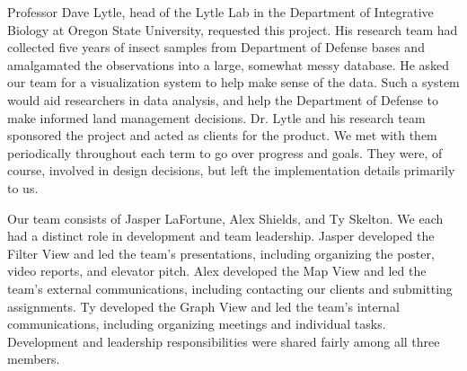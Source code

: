 Professor Dave Lytle, head of the Lytle Lab in the Department of Integrative Biology at Oregon State University, requested this project.
His research team had collected five years of insect samples from Department of Defense bases and amalgamated the observations into a large, somewhat messy database.
He asked our team for a visualization system to help make sense of the data.
Such a system would aid researchers in data analysis, and help the Department of Defense to make informed land management decisions.
Dr. Lytle and his research team sponsored the project and acted as clients for the product.
We met with them periodically throughout each term to go over progress and goals.
They were, of course, involved in design decisions, but left the implementation details primarily to us.

Our team consists of Jasper LaFortune, Alex Shields, and Ty Skelton.
We each had a distinct role in development and team leadership.
Jasper 	developed the Filter View 	and led the team's presentations, 			including organizing the poster, video reports, and elevator pitch.
Alex 	developed the Map View 		and led the team's external communications, including contacting our clients and submitting assignments.
Ty 		developed the Graph View 	and led the team's internal communications, including organizing meetings and individual tasks.
Development and leadership responsibilities were shared fairly among all three members.
